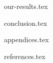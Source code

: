 \documentclass[a4paper,11px]{article}
\begin{document}
\newpage



{our-results.tex}

\newpage



{conclusion.tex}

\newpage



{appendices.tex}

\newpage




{references.tex}
\end{document}
